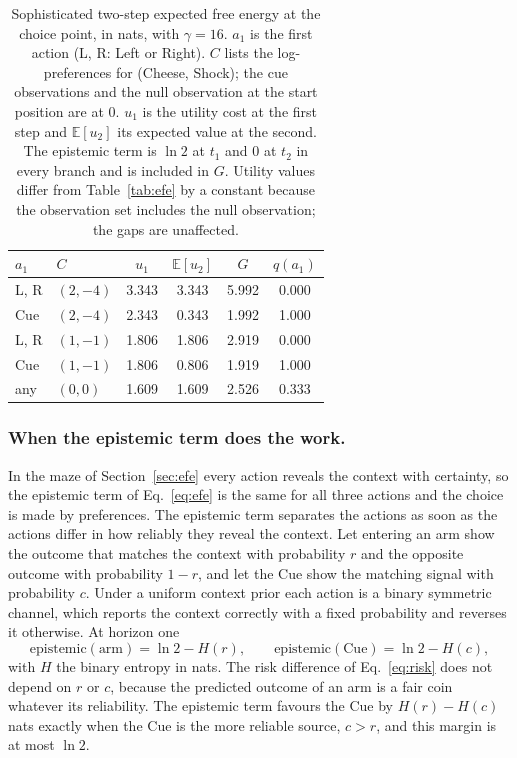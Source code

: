 \documentclass[letterpaper]{article} %
\theoremstyle{definition}
\providecommand{\E}{\mathbb{E}}
\begin{document}
\begin{table}[t]
\centering
{\small
\begin{tabular}{llcccc}
\hline
$a_1$ & $C$ & $u_1$ & $\E[u_2]$ & $G$ & $q(a_1)$ \\
\hline
L, R & $(2,-4)$ & 3.343 & 3.343 & 5.992 & 0.000 \\
Cue  & $(2,-4)$ & 2.343 & 0.343 & 1.992 & 1.000 \\
L, R & $(1,-1)$ & 1.806 & 1.806 & 2.919 & 0.000 \\
Cue  & $(1,-1)$ & 1.806 & 0.806 & 1.919 & 1.000 \\
any  & $(0,0)$  & 1.609 & 1.609 & 2.526 & 0.333 \\
\hline
\end{tabular}
}
\caption{Sophisticated two-step expected free energy at the choice point, in nats, with $\gamma = 16$. $a_1$ is the first action (L, R: Left or Right). $C$ lists the log-preferences for (Cheese, Shock); the cue observations and the null observation at the start position are at 0. $u_1$ is the utility cost at the first step and $\E[u_2]$ its expected value at the second. The epistemic term is $\ln 2$ at $t_1$ and 0 at $t_2$ in every branch and is included in $G$. Utility values differ from Table~\ref{tab:efe} by a constant because the observation set includes the null observation; the gaps are unaffected.}
\label{tab:efe2}
\end{table}

\subsubsection{When the epistemic term does the work.}\label{sec:noisyarm}
In the maze of Section~\ref{sec:efe} every action reveals the context with certainty, so the epistemic term of Eq.~\ref{eq:efe} is the same for all three actions and the choice is made by preferences. The epistemic term separates the actions as soon as the actions differ in how reliably they reveal the context. Let entering an arm show the outcome that matches the context with probability $r$ and the opposite outcome with probability $1-r$, and let the Cue show the matching signal with probability $c$. Under a uniform context prior each action is a binary symmetric channel, which reports the context correctly with a fixed probability and reverses it otherwise. At horizon one
\begin{equation}
\text{epistemic}(\text{arm}) = \ln 2 - H(r), \qquad \text{epistemic}(\text{Cue}) = \ln 2 - H(c),
\label{eq:noisyepist}
\end{equation}
with $H$ the binary entropy in nats. The risk difference of Eq.~\ref{eq:risk} does not depend on $r$ or $c$, because the predicted outcome of an arm is a fair coin whatever its reliability. The epistemic term favours the Cue by $H(r) - H(c)$ nats exactly when the Cue is the more reliable source, $c > r$, and this margin is at most $\ln 2$.
\end{document}

